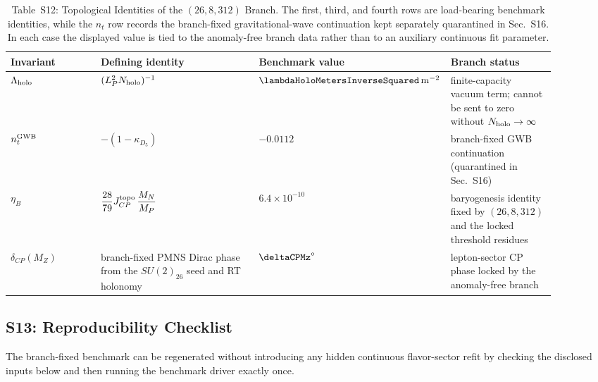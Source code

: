 \documentclass[11pt]{article}
\begin{document}
\begin{table}[t]
\centering
\small
\setlength{\tabcolsep}{4pt}
\renewcommand{\arraystretch}{1.12}
\begin{tabular}{>{\raggedright\arraybackslash}p{0.18\linewidth}>{\raggedright\arraybackslash}p{0.33\linewidth}>{\centering\arraybackslash}p{0.18\linewidth}>{\raggedright\arraybackslash}p{0.21\linewidth}}
\hline
Invariant & Defining identity & Benchmark value & Branch status \\
\hline
$\Lambda_{\rm holo}$ & $(L_P^2N_{\rm holo})^{-1}$ & $\lambdaHoloMetersInverseSquared\,\mathrm{m}^{-2}$ & finite-capacity vacuum term; cannot be sent to zero without $N_{\rm holo}\to\infty$ \\
$n_t^{\rm GWB}$ & $-(1-\kappa_{D_5})$ & $-0.0112$ & branch-fixed GWB continuation (quarantined in Sec.~S16) \\
$\eta_B$ & $\dfrac{28}{79}J_{CP}^{\rm topo}\,\dfrac{M_N}{M_P}$ & $6.4\times10^{-10}$ & baryogenesis identity fixed by $(26,8,312)$ and the locked threshold residues \\
$\delta_{CP}(M_Z)$ & branch-fixed PMNS Dirac phase from the $SU(2)_{26}$ seed and RT holonomy & $\deltaCPMz^{\circ}$ & lepton-sector CP phase locked by the anomaly-free branch \\
\hline
\end{tabular}
\caption{Table~S12: Topological Identities of the $(26,8,312)$ Branch. The first, third, and fourth rows are load-bearing benchmark identities, while the $n_t$ row records the branch-fixed gravitational-wave continuation kept separately quarantined in Sec.~S16. In each case the displayed value is tied to the anomaly-free branch data rather than to an auxiliary continuous fit parameter.}
\label{tab:s12-topological-identities}
\end{table}

\subsection*{S13: Reproducibility Checklist}

The branch-fixed benchmark can be regenerated without introducing any hidden
continuous flavor-sector refit by checking the disclosed inputs below and then
running the benchmark driver exactly once.
\end{document}
